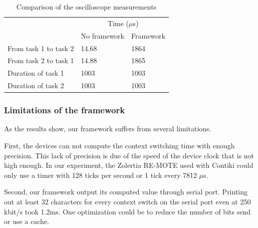 \begin{table}[!ht]
  \centering
  \begin{tabular}{lll}
                        & \multicolumn{2}{c}{Time ($\mu$s)}                                     \\ \cline{2-3} 
                        & \multicolumn{1}{c}{No framework} & Framework \\ \cline{2-3} 
  From task 1 to task 2 & 14.68                                     & 1864                  \\
  From task 2 to task 1 & 14.88                                     & 1865                  \\
  Duration of task 1    & 1003                                      & 1003                  \\
  Duration of task 2    & 1003                                      & 1003                 
  \end{tabular}
  \caption{Comparison of the oscilloscope measurements}
  \label{tab:measurements-comparison}
\end{table}

\subsubsection{Limitations of the framework}

As the results show, our framework suffers from several limitations.

First, the devices can not compute the context switching time with enough precision.
This lack of precision is due of the speed of the device clock that is not high enough.
In our experiment, the Zolertia RE-MOTE used with Contiki could only use a timer with 128 ticks per second or 1 tick every 7812 $\mu$s.

Second, our framework output its computed value through serial port.
Printing out at least 32 characters for every context switch on the serial port even at 250 kbit/s took 1.2ms.
One optimization could be to reduce the number of bits send or use a cache.
